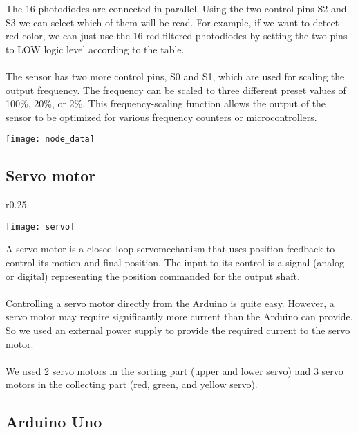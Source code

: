   The 16 photodiodes are connected in parallel. Using the two control pins S2 and S3 we can select
which of them will be read. For example, if we want to detect red color, we can just use the 16 red
filtered photodiodes by setting the two pins to LOW logic level according to the table.\\\\
The sensor has two more control pins, S0 and S1, which are used for scaling the output frequency.
The frequency can be scaled to three different preset values of 100\%, 20\%, or 2\%.
This frequency-scaling function allows the output of the sensor to be optimized for various frequency
counters or microcontrollers.

\begin{center}
    
    \texttt{[image: node\_data]}
    \end{center}

\subsection{Servo motor}

\begin{wrapfigure}{r}{0.25\textwidth}
    \begin{center}
      \texttt{[image: servo]}
    \end{center}
  \end{wrapfigure}

A servo motor is a closed loop servomechanism that uses position feedback to
control its motion and final position. The input to its control is a signal
(analog or digital) representing the position commanded for the output shaft.\\\\
Controlling a servo motor directly from the Arduino is quite easy. However,
a servo motor may require significantly more current than the Arduino can
provide. So we used an external power supply to provide the required current
to the servo motor.\\\\
We used 2 servo motors in the sorting part (upper and lower servo) and 3
servo motors in the collecting part (red, green, and yellow servo).

\subsection{Arduino Uno}

